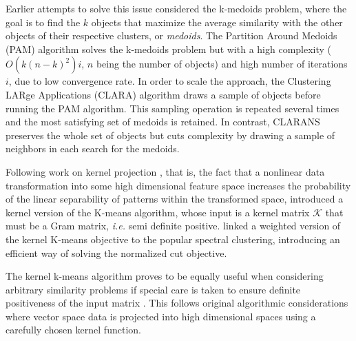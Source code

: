 \documentclass[twoside,11pt]{article}
\begin{document}
Earlier attempts to solve this issue considered the k-medoids problem, where the goal is to find the $k$ objects that maximize the average similarity with the other objects of their respective clusters, or \emph{medoids}. The Partition Around Medoids (PAM) algorithm \citep{KaufmanRousseeuw90} solves the k-medoids problem but with a high complexity ($O(k(n-k)^2)i$, $n$ being the number of objects) and high number of iterations $i$, due to low convergence rate. In order to scale the approach, the Clustering LARge Applications (CLARA) algorithm \citep{KaufmanRousseeuw90} draws a sample of objects before running the PAM algorithm. This sampling operation is repeated several times and the most satisfying set of medoids is retained. In contrast, CLARANS \citep{Ng:1994:EEC:645920.672827} preserves the whole set of objects but cuts complexity by  drawing a sample of neighbors in each search for the medoids.


Following work on kernel projection \citep{Vapnik:1995:NSL:211359}, that is, the fact that a nonlinear data transformation into some high dimensional feature space increases the probability of the linear separability of patterns within the transformed space, \citet{Girolami:2002:MKC:2325785.2326903} introduced a kernel version of the K-means algorithm, whose input is a kernel matrix $\mathcal{K}$ that must be a Gram matrix, \textit{i.e.} semi definite positive. \citet{Dhillon:2007:WGC:1313055.1313291} linked a weighted version of the kernel K-means objective to the popular spectral clustering, introducing an efficient way of solving the normalized cut objective.

The kernel k-means algorithm proves to be equally useful when considering arbitrary similarity problems if special care is taken to ensure definite positiveness of the input matrix \citep{Roth:2003:OCP:960254.960291}. This follows original algorithmic considerations where vector space data is projected into high dimensional spaces using a carefully chosen kernel function. 

\end{document}

